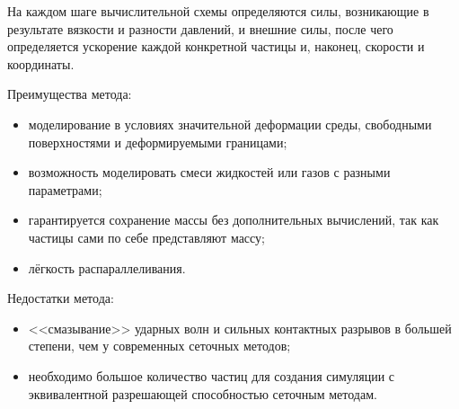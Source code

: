 На каждом шаге вычислительной схемы определяются силы, возникающие в результате вязкости и разности давлений, и внешние силы, после чего определяется ускорение каждой конкретной частицы и, наконец, скорости и координаты.

Преимущества метода:
\begin{itemize}
  \item моделирование в условиях значительной деформации среды, свободными поверхностями и деформируемыми границами;
  \item возможность моделировать смеси жидкостей или газов с разными параметрами;
  \item гарантируется сохранение массы без дополнительных вычислений, так как частицы сами по себе представляют массу;
  \item лёгкость распараллеливания.
\end{itemize}

Недостатки метода:
\begin{itemize}
  \item <<смазывание>> ударных волн и сильных контактных разрывов в большей степени, чем у современных сеточных методов;
  \item необходимо большое количество частиц для создания симуляции с эквивалентной разрешающей способностью сеточным методам.
\end{itemize}
